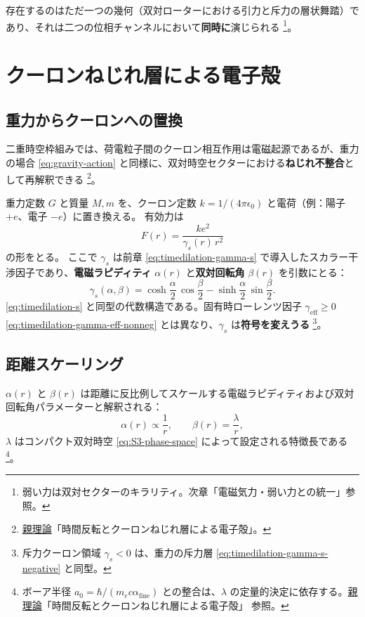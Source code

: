 \documentclass[dvipdfmx,a4paper,oneside]{jsbook}
\numberwithin{equation}{chapter}
\begin{document}
存在するのはただ一つの幾何（双対ローターにおける引力と斥力の層状舞踏）であり、それは二つの位相チャンネルにおいて\textbf{同時に}演じられる \footnote{弱い力は双対セクターのキラリティ。次章「電磁気力・弱い力との統一」参照。}。

\section{クーロンねじれ層による電子殻}

\subsection{重力からクーロンへの置換}

二重時空枠組みでは、荷電粒子間のクーロン相互作用は電磁起源であるが、重力の場合 \eqref{eq:gravity-action} と同様に、双対時空セクターにおける\textbf{ねじれ不整合}として再解釈できる \footnote{\hyperref[sec:sister-manuscripts]{親理論}「時間反転とクーロンねじれ層による電子殻」。}。

重力定数 \(G\) と質量 \(M, m\) を、クーロン定数 \(k = 1/(4\pi\epsilon_0)\) と電荷（例：陽子 \(+e\)、電子 \(-e\)）に置き換える。
有効力は
\begin{equation}
  F(r) = \frac{k e^{2}}{\gamma_s(r)\, r^{2}}
  \label{eq:nuclear-coulomb-force}
\end{equation}
の形をとる。
ここで \(\gamma_s\) は前章 \eqref{eq:timedilation-gamma-s} で導入したスカラー干渉因子であり、\textbf{電磁ラピディティ} \(\alpha(r)\) と\textbf{双対回転角} \(\beta(r)\) を引数にとる：
\begin{equation}
  \gamma_s(\alpha, \beta)
  = \cosh\!\frac{\alpha}{2}\,\cos\!\frac{\beta}{2}
  - \sinh\!\frac{\alpha}{2}\,\sin\!\frac{\beta}{2}.
  \label{eq:nuclear-gamma-s-em}
\end{equation}
\eqref{eq:timedilation-s} と同型の代数構造である。固有時ローレンツ因子 \(\gamma_{\mathrm{eff}} \geq 0\) \eqref{eq:timedilation-gamma-eff-nonneg} とは異なり、\(\gamma_s\) は\textbf{符号を変えうる} \footnote{斥力クーロン領域 \(\gamma_s < 0\) は、重力の斥力層 \eqref{eq:timedilation-gamma-s-negative} と同型。}。

\subsection{距離スケーリング}

\(\alpha(r)\) と \(\beta(r)\) は距離に反比例してスケールする電磁ラピディティおよび双対回転角パラメーターと解釈される：
\begin{equation}
  \alpha(r) \propto \frac{1}{r},
  \qquad
  \beta(r) = \frac{\lambda}{r},
  \label{eq:nuclear-em-scaling}
\end{equation}
\(\lambda\) はコンパクト双対時空 \eqref{eq:S3-phase-space} によって設定される特徴長である \footnote{ボーア半径 \(a_0 = \hbar/(m_e c \alpha_{\mathrm{fine}})\) との整合は、\(\lambda\) の定量的決定に依存する。\hyperref[sec:sister-manuscripts]{親理論}「時間反転とクーロンねじれ層による電子殻」 参照。}。
\end{document}
